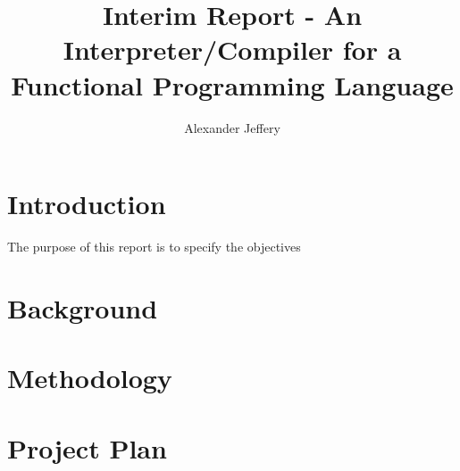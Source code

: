 \documentclass{report}
\title{Interim Report - An Interpreter/Compiler for a Functional Programming Language}
\author{Alexander Jeffery}
\begin{document}
\maketitle

\section{Introduction}

The purpose of this report is to specify the objectives

\section{Background}

\section{Methodology}

\section{Project Plan}
\end{document}
